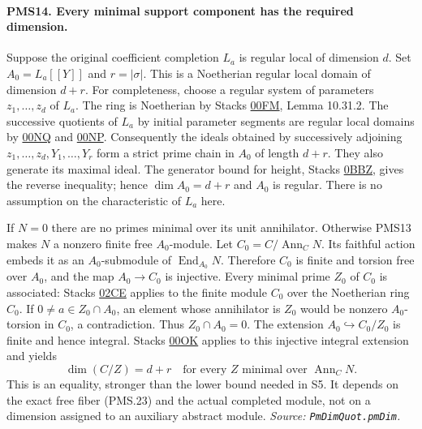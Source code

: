 \paragraph{PMS14. Every minimal support component has the required dimension.}
\label{claim:PMS14}
Suppose the original coefficient completion $L_a$ is regular local
of dimension $d$.  Set $A_0=L_a[[Y]]$ and $r=|\sigma|$.
This is a Noetherian regular local domain of dimension $d+r$.
For completeness, choose a regular system of parameters
$z_1,\ldots,z_d$ of $L_a$.
The ring is Noetherian by Stacks
\href{https://stacks.math.columbia.edu/tag/00FM}{00FM}, Lemma
10.31.2.  The successive quotients of $L_a$ by initial parameter
segments are regular local domains by
\href{https://stacks.math.columbia.edu/tag/00NQ}{00NQ} and
\href{https://stacks.math.columbia.edu/tag/00NP}{00NP}.
Consequently the ideals obtained by successively adjoining
$z_1,\ldots,z_d,Y_1,\ldots,Y_r$ form a strict prime chain in
$A_0$ of length $d+r$.  They also generate its maximal ideal.
The generator bound for height, Stacks
\href{https://stacks.math.columbia.edu/tag/0BBZ}{0BBZ}, gives the
reverse inequality; hence $\dim A_0=d+r$ and $A_0$ is regular.
There is no assumption on the characteristic of $L_a$ here.

If $N=0$ there are no primes minimal over its unit annihilator.
Otherwise PMS13 makes $N$ a nonzero finite free $A_0$-module.
Let $C_0=C/\operatorname{Ann}_C N$.
Its faithful action embeds it as an $A_0$-submodule of
$\operatorname{End}_{A_0}N$.  Therefore $C_0$ is finite and
torsion free over $A_0$, and the map $A_0\to C_0$ is injective.
Every minimal prime $Z_0$ of $C_0$ is associated: Stacks
\href{https://stacks.math.columbia.edu/tag/02CE}{02CE} applies
to the finite module $C_0$ over the Noetherian ring $C_0$.
If $0\ne a\in Z_0\cap A_0$, an element whose annihilator is
$Z_0$ would be nonzero $A_0$-torsion in $C_0$, a contradiction.
Thus $Z_0\cap A_0=0$.
The extension $A_0\hookrightarrow C_0/Z_0$ is finite and hence
integral.  Stacks
\href{https://stacks.math.columbia.edu/tag/00OK}{00OK} applies
to this injective integral extension and yields
\[
 \dim(C/Z)=d+r
 \quad\text{for every }Z\text{ minimal over }\operatorname{Ann}_C N.
                                                        \tag{PMS.25}
\]
This is an equality, stronger than the lower bound needed in S5.
It depends on the exact free fiber (PMS.23) and the actual
completed module, not on a dimension assigned to an auxiliary
abstract module.
\hfill\textit{Source: \texttt{PmDimQuot.pmDim}.}

